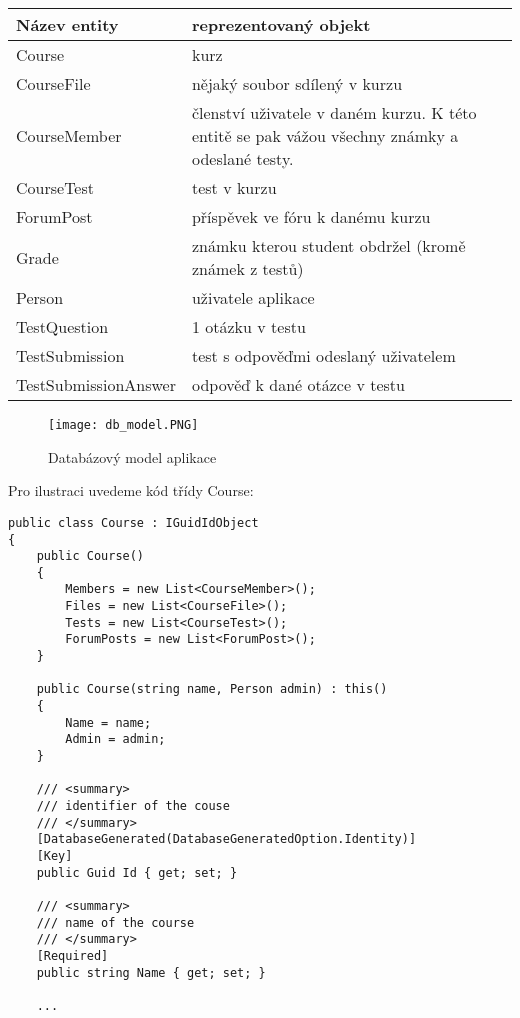\begin{table}[ht]
	\centering
	\begin{tabular}{| l | p{9cm} |}
		\hline
		Název entity & reprezentovaný objekt \\
		\hline \hline
		Course & kurz \\ \hline
		CourseFile & nějaký soubor sdílený v kurzu \\ \hline
		CourseMember & členství uživatele v daném kurzu. 
		K této entitě se pak vážou všechny známky a odeslané testy. \\ \hline
		CourseTest & test v kurzu \\ \hline
		ForumPost & příspěvek ve fóru k danému kurzu \\ \hline
		Grade & známku kterou student obdržel (kromě známek z testů) \\ \hline
		Person & uživatele aplikace \\ \hline
		TestQuestion & 1 otázku v testu \\ \hline
		TestSubmission & test s odpověďmi odeslaný uživatelem \\ \hline
		TestSubmissionAnswer & odpověď k dané otázce v testu \\
		\hline
	\end{tabular}
\end{table}

\newpage

\begin{figure}
	\centering
	\texttt{[image: db\_model.PNG]}
	\caption{Databázový model aplikace}
\end{figure}

\newpage

Pro ilustraci uvedeme kód třídy Course:

\begin{lstlisting}
public class Course : IGuidIdObject
{
	public Course()
	{
		Members = new List<CourseMember>();
		Files = new List<CourseFile>();
		Tests = new List<CourseTest>();
		ForumPosts = new List<ForumPost>();
	}
	
	public Course(string name, Person admin) : this()
	{
		Name = name;
		Admin = admin;
	}
	
	/// <summary>
	/// identifier of the couse
	/// </summary>
	[DatabaseGenerated(DatabaseGeneratedOption.Identity)]
	[Key]
	public Guid Id { get; set; }
	
	/// <summary>
	/// name of the course
	/// </summary>
	[Required]
	public string Name { get; set; }
	
	...
\end{lstlisting}

